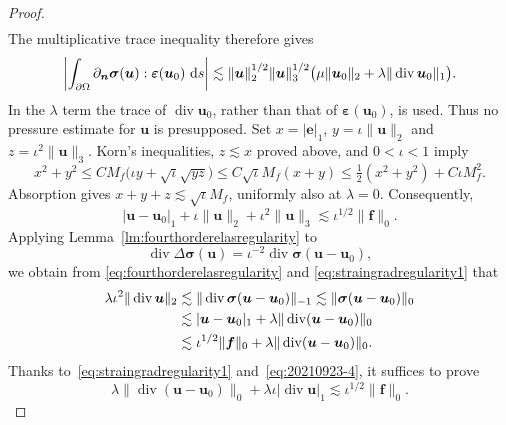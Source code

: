 \documentclass[10pt]{amsart}
\newcommand{\dd}{\,{\rm d}}
\renewcommand{\div}{\operatorname{div}}
\numberwithin{equation}{section}
\begin{document}
\begin{proof}
\[\begin{aligned}
\end{aligned}
\]
The multiplicative trace inequality therefore gives
\[
\left|\int_{\partial\Omega}\partial_{\boldsymbol n}\boldsymbol\sigma(\boldsymbol u):\boldsymbol\varepsilon(\boldsymbol u_0)\,\dd s\right|
\lesssim \|\boldsymbol u\|_2^{1/2}\|\boldsymbol u\|_3^{1/2}
\bigl(\mu\|\boldsymbol u_0\|_2+\lambda\|\div\boldsymbol u_0\|_1\bigr).
\]
In the $\lambda$ term the trace of $\div\boldsymbol u_0$, rather than that of $\boldsymbol\varepsilon(\boldsymbol u_0)$, is used. Thus no pressure estimate for $\boldsymbol u$ is presupposed.
Set $x=|\boldsymbol e|_1$, $y=\iota\|\boldsymbol u\|_2$ and $z=\iota^2\|\boldsymbol u\|_3$. Korn's inequalities, $z\lesssim x$ proved above, and $0<\iota<1$ imply
\[
x^2+y^2\leq C M_f\bigl(\iota y+\sqrt\iota\sqrt{yz}\bigr)
\leq C\sqrt\iota M_f(x+y)
\leq\tfrac12(x^2+y^2)+C\iota M_f^2.
\]
Absorption gives $x+y+z\lesssim\sqrt\iota M_f$, uniformly also at $\lambda=0$. Consequently,
\begin{equation}\label{eq:straingradregularity1}
	|\boldsymbol u-\boldsymbol u_0|_{1} +\iota\|\boldsymbol u\|_2  + \iota^{2}\|\boldsymbol u\|_{3} \lesssim \iota^{1/2}\|\boldsymbol f\|_0.
	\end{equation}
Applying Lemma~\ref{lm:fourthorderelasregularity} to %
	\begin{equation}\label{eq:20210919}
	\div\Delta\boldsymbol\sigma(\boldsymbol u)=\iota^{-2}\div\boldsymbol\sigma(\boldsymbol u-\boldsymbol u_0),
	\end{equation}
we obtain from \eqref{eq:fourthorderelasregularity} and \eqref{eq:straingradregularity1} that
	\begin{align}
	\lambda\iota^{2}\|\div\boldsymbol u\|_{2}&\lesssim \|\div\boldsymbol\sigma(\boldsymbol u-\boldsymbol u_0)\|_{-1}\lesssim \|\boldsymbol\sigma(\boldsymbol u-\boldsymbol u_0)\|_{0} \notag\\
	&\lesssim |\boldsymbol u-\boldsymbol u_0|_1+\lambda\|\div(\boldsymbol u-\boldsymbol u_0)\|_0 \notag\\
	&\lesssim \iota^{1/2}\|\boldsymbol f\|_0+\lambda\|\div(\boldsymbol u-\boldsymbol u_0)\|_0. \label{eq:20210923-4}
	\end{align}
Thanks to~\eqref{eq:straingradregularity1} and~\eqref{eq:20210923-4}, it suffices to prove
\begin{equation}\label{eq:straingradregularity0}
\lambda\|\div(\boldsymbol u-\boldsymbol u_0)\|_0+\lambda\iota|\div\boldsymbol u|_1\lesssim\iota^{1/2}\|\boldsymbol f\|_0.
\end{equation}

\end{proof}
\end{document}
